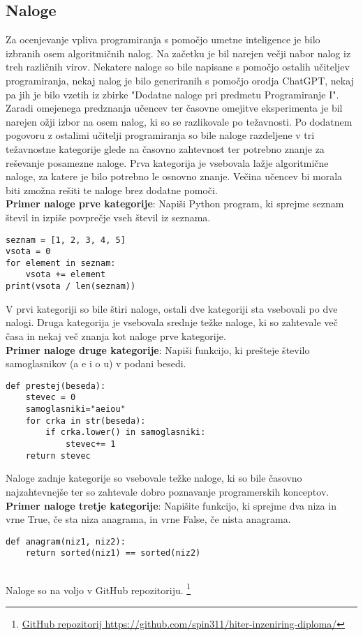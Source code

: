 \documentclass[a4paper,12pt,openright]{book}
\begin{document}
\subsection{Naloge}
Za ocenjevanje vpliva programiranja s pomočjo umetne inteligence je bilo izbranih osem algoritmičnih nalog.
Na začetku je bil narejen večji nabor nalog iz treh različnih virov. Nekatere naloge so bile napisane s pomočjo ostalih učiteljev programiranja, nekaj nalog je bilo generiranih s pomočjo orodja ChatGPT, nekaj pa jih je bilo vzetih iz zbirke "Dodatne naloge pri predmetu Programiranje I". \cite{dodatneNaloge} \\
Zaradi omejenega predznanja učencev ter časovne omejitve eksperimenta je bil narejen ožji izbor na osem nalog, ki so se razlikovale po težavnosti. Po dodatnem pogovoru z ostalimi učitelji programiranja so bile naloge razdeljene v tri težavnostne kategorije glede na časovno zahtevnost ter potrebno znanje za reševanje posamezne naloge. Prva kategorija je vsebovala lažje algoritmične naloge, za katere je bilo potrebno le osnovno znanje. Večina učencev bi morala biti zmožna rešiti te naloge brez dodatne pomoči.
\\
\textbf{Primer naloge prve kategorije}:
Napiši Python program, ki sprejme seznam števil in izpiše povprečje vseh števil iz seznama.
\begin{lstlisting}[style=python]
seznam = [1, 2, 3, 4, 5]
vsota = 0
for element in seznam:
    vsota += element
print(vsota / len(seznam))
\end{lstlisting}
    

V prvi kategoriji so bile štiri naloge, ostali dve kategoriji sta vsebovali po dve nalogi. Druga kategorija je vsebovala srednje težke naloge, ki so zahtevale več časa  in nekaj več znanja kot naloge prve kategorije. 
\\
\textbf{Primer naloge druge kategorije}:
Napiši funkcijo, ki prešteje število samoglasnikov (a e i o u) v podani besedi.
\begin{lstlisting}[style=python]
def prestej(beseda):
    stevec = 0
    samoglasniki="aeiou"
    for crka in str(beseda):
        if crka.lower() in samoglasniki:
            stevec+= 1
    return stevec
\end{lstlisting}
Naloge zadnje kategorije so vsebovale težke naloge, ki so bile časovno najzahtevnejše ter so zahtevale dobro poznavanje programerskih konceptov.
\\
\textbf{Primer naloge tretje kategorije}:
Napišite funkcijo, ki sprejme dva niza in vrne True, če sta niza anagrama, in vrne False, če nista anagrama.
\pagebreak
\begin{lstlisting}[style=python]
def anagram(niz1, niz2):
    return sorted(niz1) == sorted(niz2)
    
\end{lstlisting}
Naloge so na voljo v GitHub repozitoriju.
\footnote{\href{https://github.com/spin311/hiter-inzeniring-diploma/}{GitHub repozitorij https://github.com/spin311/hiter-inzeniring-diploma/}}
\end{document}

